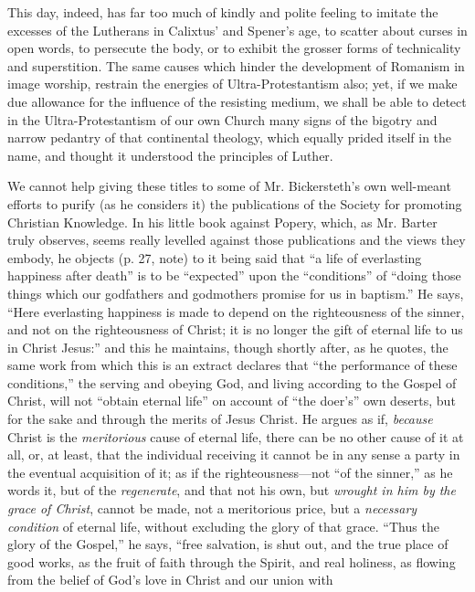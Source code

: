 This day, indeed, has far too much of kindly and
polite feeling to imitate the excesses of the Lutherans in Calixtus' and
Spener's age, to scatter about curses in open words, to persecute the
body, or to exhibit the grosser forms of technicality and superstition.
The same causes which hinder the development of Romanism in image
worship, restrain the energies of Ultra-Protestantism also; yet, if we
make due allowance for the influence of the resisting medium, we shall
be able to detect in the Ultra-Protestantism of our own Church many
signs of the bigotry and narrow pedantry of that continental theology,
which equally prided itself in the name, and thought it understood the
principles of Luther.

We cannot help giving these titles to some of Mr.
Bickersteth's own well-meant efforts to purify (as he considers it) the
publications of the Society for promoting Christian Knowledge. In his
little book against Popery, which, as Mr. Barter truly observes, seems
really levelled against those publications and the views they embody, he
objects (p. 27, note) to it being said that ``a life of everlasting
happiness after death'' is to be ``expected'' upon the ``conditions'' of ``doing
those things which our godfathers and godmothers promise for us in
baptism.'' He says, ``Here everlasting happiness is made to depend
on the righteousness of the sinner, and not on the righteousness of
Christ; it is no longer the gift of eternal life to us in Christ Jesus:''
and this he maintains, though shortly after, as he quotes, the same work
from which this is an extract declares that ``the performance of these
conditions,'' the serving and obeying God, and living according to the
Gospel of Christ, will not ``obtain eternal life'' on account of ``the doer's''
own deserts, but for the sake and through the merits of Jesus Christ. He
argues as if, \emph{because} Christ is the \emph{meritorious} cause of
eternal life, there can be no other cause of it at all, or, at least,
that the individual receiving it cannot be in any sense a party in the
eventual acquisition of it; as if the righteousness—not ``of the
sinner,'' as he words it, but of the \emph{regenerate}, and that not his
own, but \emph{wrought in him by the grace of Christ}, cannot be made,
not a meritorious price, but a \emph{necessary condition} of eternal
life, without excluding the glory of that grace. ``Thus the glory of the
Gospel,'' he says, ``free salvation, is shut out, and the true place of
good works, as the fruit of faith through the Spirit, and real holiness,
as flowing from the belief of God's love in Christ and our union with

